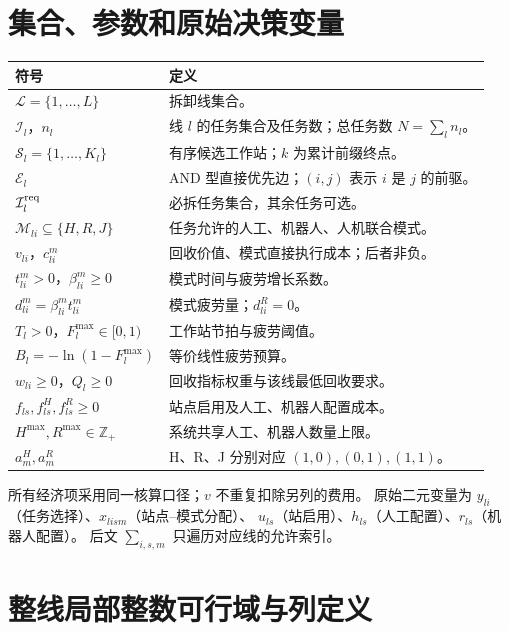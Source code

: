 \documentclass[UTF8,a4paper,11pt]{ctexart}
\begin{document}
\section{集合、参数和原始决策变量}
\begin{longtable}{p{}p{}}
\toprule 符号 & 定义\\\midrule
$\mathcal L=\{1,\ldots,L\}$ & 拆卸线集合。\\
$\mathcal I_l$，$n_l$ & 线 $l$ 的任务集合及任务数；总任务数 $N=\sum_l n_l$。\\
$\mathcal S_l=\{1,\ldots,K_l\}$ & 有序候选工作站；$k$ 为累计前缀终点。\\
$\mathcal E_l$ & AND 型直接优先边；$(i,j)$ 表示 $i$ 是 $j$ 的前驱。\\
$\mathcal I_l^{\rm req}$ & 必拆任务集合，其余任务可选。\\
$\mathcal M_{li}\subseteq\{H,R,J\}$ & 任务允许的人工、机器人、人机联合模式。\\
$v_{li}$，$c_{li}^m$ & 回收价值、模式直接执行成本；后者非负。\\
$t_{li}^m>0$，$\beta_{li}^m\geq0$ & 模式时间与疲劳增长系数。\\
$d_{li}^m=\beta_{li}^m t_{li}^m$ & 模式疲劳量；$d_{li}^R=0$。\\
$T_l>0$，$F_l^{\max}\in[0,1)$ & 工作站节拍与疲劳阈值。\\
$B_l=-\ln(1-F_l^{\max})$ & 等价线性疲劳预算。\\
$w_{li}\geq0$，$Q_l\geq0$ & 回收指标权重与该线最低回收要求。\\
$f_{ls},f^H_{ls},f^R_{ls}\geq0$ & 站点启用及人工、机器人配置成本。\\
$H^{\max},R^{\max}\in\mathbb Z_+$ & 系统共享人工、机器人数量上限。\\
$a_m^H,a_m^R$ & H、R、J 分别对应 $(1,0),(0,1),(1,1)$。\\\bottomrule
\end{longtable}
所有经济项采用同一核算口径；$v$ 不重复扣除另列的费用。
原始二元变量为 $y_{li}$（任务选择）、$x_{lism}$（站点--模式分配）、
$u_{ls}$（站启用）、$h_{ls}$（人工配置）、$r_{ls}$（机器人配置）。
后文 $\sum_{i,s,m}$ 只遍历对应线的允许索引。

\section{整线局部整数可行域与列定义}
\end{document}
